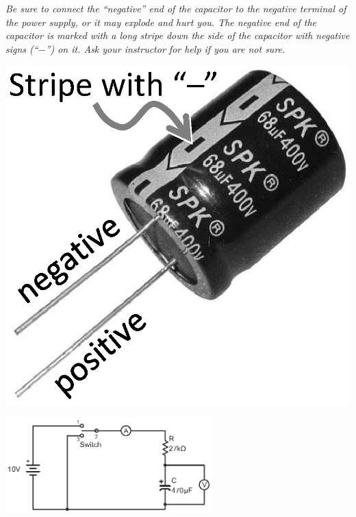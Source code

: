 \begin{minipage}{0.82\textwidth}
\begin{newboxed}
\vspace{-0.2 in}
\textit{Be sure to connect the “negative” end of the capacitor to the negative terminal of the power supply, or it may explode and hurt you.  The negative end of the capacitor is marked with a long stripe down the side of the capacitor with negative signs (``$-$'') on it.  Ask your instructor for help if you are not sure.}
\vspace{-0.1 in}
\end{newboxed}
\end{minipage}
\begin{minipage}{0.17\textwidth}
\includegraphics[width=1.0\textwidth]{rc_circuits/capacitor2_bw.eps}
\end{minipage}

\begin{center}
\vspace{-0.3 in}
\includegraphics[width=0.6\textwidth]{rc_circuits/single_dc_capacitor3.eps}
\vspace{-0.1 in}
\end{center}

